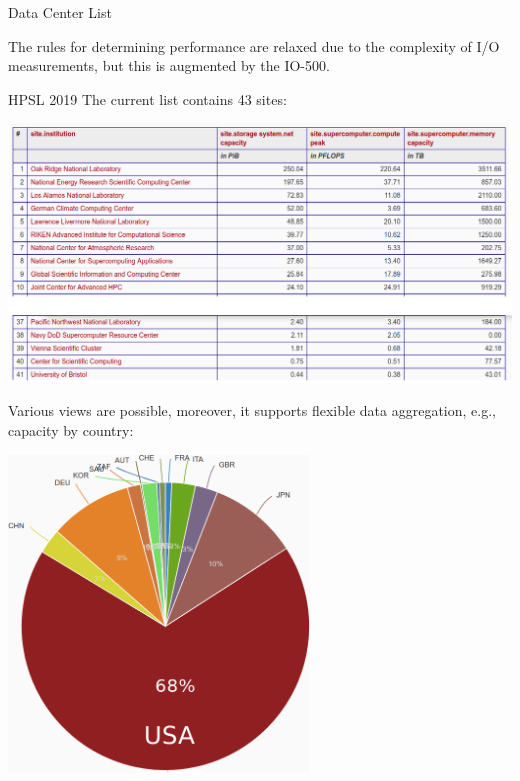 \documentclass[portrait,a0paper,fontscale=0.4]{baposter}
\begin{document}
\begin{poster}
\begin{posterbox}[name=schedule,column=2,span=1, above=bottom, below=io500]{Data Center List}
\vspace*{-1em}

The rules for determining performance are relaxed due to the complexity of I/O measurements, but this is augmented by the IO-500.
\end{posterbox}




\begin{posterbox}[name=engineering,column=3]{HPSL 2019}
The current list contains 43 sites:

\includegraphics[width=\textwidth]{dcl-2018}

Various views are possible, moreover, it
supports flexible data aggregation, e.g., capacity by country:

\vspace*{-2em}

\begin{center}
\includegraphics[width=0.6\textwidth]{aggregated-by-country}
\end{center}


\end{posterbox}
\end{poster}
\end{document}
